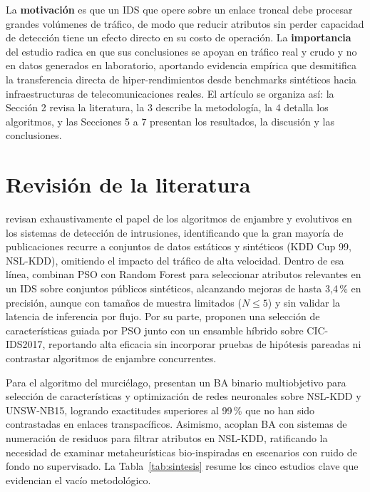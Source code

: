 \documentclass[11pt,a4paper]{article}
\begin{document}
La \textbf{motivación} es que un IDS que opere sobre un enlace troncal debe procesar grandes volúmenes de tráfico, de modo que reducir atributos sin perder capacidad de detección tiene un efecto directo en su costo de operación. La \textbf{importancia} del estudio radica en que sus conclusiones se apoyan en tráfico real y crudo y no en datos generados en laboratorio, aportando evidencia empírica que desmitifica la transferencia directa de hiper-rendimientos desde benchmarks sintéticos hacia infraestructuras de telecomunicaciones reales. El artículo se organiza así: la Sección 2 revisa la literatura, la 3 describe la metodología, la 4 detalla los algoritmos, y las Secciones 5 a 7 presentan los resultados, la discusión y las conclusiones.

\section{Revisión de la literatura}

\textcite{thakkar2020} revisan exhaustivamente el papel de los algoritmos de enjambre y evolutivos en los sistemas de detección de intrusiones, identificando que la gran mayoría de publicaciones recurre a conjuntos de datos estáticos y sintéticos (KDD Cup 99, NSL-KDD), omitiendo el impacto del tráfico de alta velocidad. Dentro de esa línea, \textcite{safa2024} combinan PSO con Random Forest para seleccionar atributos relevantes en un IDS sobre conjuntos públicos sintéticos, alcanzando mejoras de hasta 3,4\,\% en precisión, aunque con tamaños de muestra limitados ($N \le 5$) y sin validar la latencia de inferencia por flujo. Por su parte, \textcite{louk2022} proponen una selección de características guiada por PSO junto con un ensamble híbrido sobre CIC-IDS2017, reportando alta eficacia sin incorporar pruebas de hipótesis pareadas ni contrastar algoritmos de enjambre concurrentes.

Para el algoritmo del murciélago, \textcite{ghanem2022} presentan un BA binario multiobjetivo para selección de características y optimización de redes neuronales sobre NSL-KDD y UNSW-NB15, logrando exactitudes superiores al 99\,\% que no han sido contrastadas en enlaces transpacíficos. Asimismo, \textcite{saheed2024} acoplan BA con sistemas de numeración de residuos para filtrar atributos en NSL-KDD, ratificando la necesidad de examinar metaheurísticas bio-inspiradas en escenarios con ruido de fondo no supervisado. La Tabla~\ref{tab:sintesis} resume los cinco estudios clave que evidencian el vacío metodológico.
\end{document}
